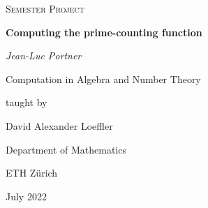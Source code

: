 \begin{titlepage}
	\centering
	\vspace*{\fill}
	{\scshape\huge Semester Project\par}
	\vspace{1.5cm}
	{\Huge\bfseries Computing the prime-counting function\par}
	\vspace{1.5cm}
	{\LARGE\itshape Jean-Luc Portner\par}
	\vspace{2cm}
	{\large Computation in Algebra and Number Theory\par
	taught by\par
	David Alexander Loeffler\par}
	\vspace{3cm}
	{\large Department of Mathematics\par
	ETH Zürich\par
	July 2022}
	\vfill
\end{titlepage}
